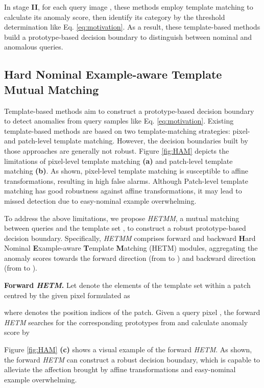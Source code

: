 \documentclass[default,iicol]{sn-jnl}\usepackage[algo2e,ruled,linesnumbered]{algorithm2e}
\theoremstyle{thmstyleone}\newtheorem{theorem}{Theorem}\newtheorem{proposition}[theorem]{Proposition}
\theoremstyle{thmstyletwo}\newtheorem{example}{Example}\newtheorem{remark}{Remark}
\theoremstyle{thmstylethree}\newtheorem{definition}{Definition}
\begin{document}
In stage \textbf{II}, for each query image , these methods employ template matching to calculate its anomaly score, then identify its category by the threshold determination like Eq. \ref{eq:motivation}.
As a result, these template-based methods build a prototype-based decision boundary to distinguish between nominal and anomalous queries.

\subsection{Hard Nominal Example-aware Template Mutual Matching}\label{sec:HAM}
Template-based methods aim to construct a prototype-based decision boundary to detect anomalies from query samples like Eq. \ref{eq:motivation}.
Existing template-based methods are based on two template-matching strategies: pixel- and patch-level template matching.
However, the decision boundaries built by those approaches are generally not robust.
Figure \ref{fig:HAM} depicts the limitations of pixel-level template matching \textbf{(a)} and patch-level template matching \textbf{(b)}.
As shown, pixel-level template matching is susceptible to affine transformations, resulting in high false alarms.
Although Patch-level template matching has good robustness against affine transformations, it may lead to missed detection due to easy-nominal example overwhelming.

To address the above limitations, we propose \textit{HETMM}, a mutual matching between queries  and the template set , to construct a robust prototype-based decision boundary.
Specifically, \textit{HETMM} comprises forward and backward \textbf{H}ard Nominal \textbf{E}xample-aware \textbf{T}emplate \textbf{M}atching (HETM) modules, aggregating the anomaly scores towards the forward direction (from  to ) and backward direction (from  to ).

\noindent\textbf{Forward \textit{HETM}. }
Let  denote the elements of the template set  within a  patch centred by the given pixel  formulated as

where  denotes the position indices of the patch.
Given a query pixel , the forward \textit{HETM} searches for the corresponding prototypes from  and calculate anomaly score by

Figure \ref{fig:HAM} \textbf{(c)} shows a visual example of the forward \textit{HETM}.
As shown, the forward \textit{HETM} can construct a robust decision boundary, which is capable to alleviate the affection brought by affine transformations and easy-nominal example overwhelming.
\end{document}
